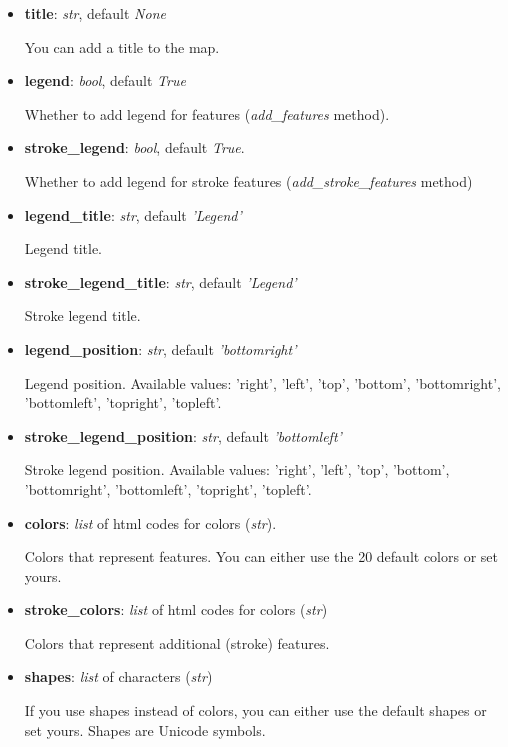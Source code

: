 \documentclass[a4paper,12pt]{article}
\begin{document}
\begin{itemize}
 \item \textbf{title}: \textit{str}, default \textit{None}
 
 You can add a title to the map.
 
 \item \textbf{legend}: \textit{bool}, default \textit{True}
 
 Whether to add legend for features (\textit{add\_features} method).
 
 \item \textbf{stroke\_legend}: \textit{bool}, default \textit{True}.

 Whether to add legend for stroke features (\textit{add\_stroke\_features} method)

 \item \textbf{legend\_title}: \textit{str}, default \textit{'Legend'}
 
 Legend title.
 
 \item \textbf{stroke\_legend\_title}: \textit{str}, default \textit{'Legend'}
 
 Stroke legend title.
 
 \item \textbf{legend\_position}: \textit{str}, default \textit{'bottomright'}
 
 Legend position. Available values: 'right', 'left', 'top', 'bottom', 'bottomright', 'bottomleft', 'topright', 'topleft'.

 \item \textbf{stroke\_legend\_position}: \textit{str}, default \textit{'bottomleft'}
 
 Stroke legend position. Available values: 'right', 'left', 'top', 'bottom', 'bottomright', 'bottomleft', 'topright', 'topleft'.
 
 \item \textbf{colors}: \textit{list} of html codes for colors (\textit{str}).
 
 Colors that represent features. You can either use the 20 default colors or set yours.
 
 \item \textbf{stroke\_colors}: \textit{list} of html codes for colors (\textit{str})
 
 Colors that represent additional (stroke) features.

 \item \textbf{shapes}: \textit{list} of characters (\textit{str})
 
 If you use shapes instead of colors, you can either use the default shapes or set yours. Shapes are Unicode symbols.


\end{itemize}
\end{document}
